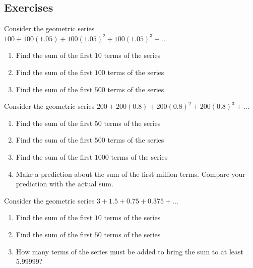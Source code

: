 \documentclass[10pt,]{book}
\theoremstyle{ptxdefinitionnotitle}
\theoremstyle{ptxdefinitiontitle}
\theoremstyle{ptxdefinitionnotitle}
\theoremstyle{ptxdefinitiontitle}
\theoremstyle{ptxdefinitionnotitle}
\theoremstyle{ptxdefinitiontitle}
\numberwithin{equation}{section}
\begin{document}
\subsection*{Exercises}\hypertarget{exercises-6}{}
\begin{divisionexercise}{1}\hypertarget{exercise-32}{}
\hypertarget{p-173}{}%
Consider the geometric series \(100+100(1.05)+100(1.05)^2+100(1.05)^3+...\)%
\leavevmode%
\begin{enumerate}[label=(\alph*)]
\item\hypertarget{li-65}{}Find the sum of the first \(10\) terms of the series%
\item\hypertarget{li-66}{}Find the sum of the first \(100\) terms of the series%
\item\hypertarget{li-67}{}Find the sum of the first \(500\) terms of the series%
\end{enumerate}
\end{divisionexercise}%
\begin{divisionexercise}{2}\hypertarget{exercise-33}{}
\hypertarget{p-174}{}%
Consider the geometric series \(200+200(0.8)+200(0.8)^2+200(0.8)^3+...\)%
\leavevmode%
\begin{enumerate}[label=(\alph*)]
\item\hypertarget{li-68}{}Find the sum of the first \(50\) terms of the series%
\item\hypertarget{li-69}{}Find the sum of the first \(500\) terms of the series%
\item\hypertarget{li-70}{}Find the sum of the first \(1000\) terms of the series%
\item\hypertarget{li-71}{}Make a prediction about the sum of the first million terms. Compare your prediction with the actual sum.%
\end{enumerate}
\end{divisionexercise}%
\begin{divisionexercise}{3}\hypertarget{exercise-34}{}
\hypertarget{p-175}{}%
Consider the geometric series \(3+1.5+0.75+0.375+...\)%
\leavevmode%
\begin{enumerate}[label=(\alph*)]
\item\hypertarget{li-72}{}Find the sum of the first \(10\) terms of the series%
\item\hypertarget{li-73}{}Find the sum of the first \(50\) terms of the series%
\item\hypertarget{li-74}{}How many terms of the series must be added to bring the sum to at least \(5.99999\)?%
\end{enumerate}
\end{divisionexercise}%
\end{document}
